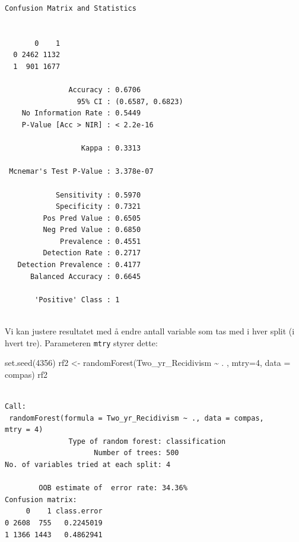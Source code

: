 \documentclass[
  letterpaper,
  DIV=11,
  numbers=noendperiod]{scrreprt}
\newenvironment{Shaded}{\begin{snugshade}}{\end{snugshade}}
\newcommand{\AttributeTok}[1]{\textcolor[rgb]{0.40,0.45,0.13}{#1}}
\newcommand{\DecValTok}[1]{\textcolor[rgb]{0.68,0.00,0.00}{#1}}
\newcommand{\FunctionTok}[1]{\textcolor[rgb]{0.28,0.35,0.67}{#1}}
\newcommand{\NormalTok}[1]{\textcolor[rgb]{0.00,0.23,0.31}{#1}}
\newcommand{\OtherTok}[1]{\textcolor[rgb]{0.00,0.23,0.31}{#1}}
\newcommand{\SpecialCharTok}[1]{\textcolor[rgb]{0.37,0.37,0.37}{#1}}
\begin{document}
\begin{verbatim}
Confusion Matrix and Statistics

   
       0    1
  0 2462 1132
  1  901 1677
                                          
               Accuracy : 0.6706          
                 95% CI : (0.6587, 0.6823)
    No Information Rate : 0.5449          
    P-Value [Acc > NIR] : < 2.2e-16       
                                          
                  Kappa : 0.3313          
                                          
 Mcnemar's Test P-Value : 3.378e-07       
                                          
            Sensitivity : 0.5970          
            Specificity : 0.7321          
         Pos Pred Value : 0.6505          
         Neg Pred Value : 0.6850          
             Prevalence : 0.4551          
         Detection Rate : 0.2717          
   Detection Prevalence : 0.4177          
      Balanced Accuracy : 0.6645          
                                          
       'Positive' Class : 1               
                                          
\end{verbatim}

Vi kan justere resultatet med å endre antall variable som tas med i hver
split (i hvert tre). Parameteren \texttt{mtry} styrer dette:

\begin{Shaded}
\begin{Highlighting}[]
\FunctionTok{set.seed}\NormalTok{(}\DecValTok{4356}\NormalTok{)}
\NormalTok{rf2 }\OtherTok{\textless{}{-}} \FunctionTok{randomForest}\NormalTok{(Two\_yr\_Recidivism }\SpecialCharTok{\textasciitilde{}}\NormalTok{ . ,}
                    \AttributeTok{mtry=}\DecValTok{4}\NormalTok{,}
                    \AttributeTok{data =}\NormalTok{ compas)}
\NormalTok{rf2}
\end{Highlighting}
\end{Shaded}

\begin{verbatim}

Call:
 randomForest(formula = Two_yr_Recidivism ~ ., data = compas,      mtry = 4) 
               Type of random forest: classification
                     Number of trees: 500
No. of variables tried at each split: 4

        OOB estimate of  error rate: 34.36%
Confusion matrix:
     0    1 class.error
0 2608  755   0.2245019
1 1366 1443   0.4862941
\end{verbatim}
\end{document}
